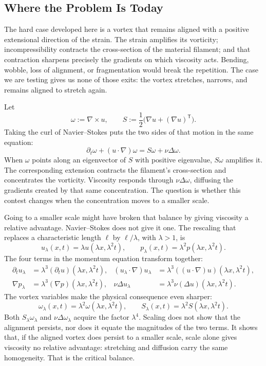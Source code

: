 \subsection{Where the Problem Is Today}\label{sub:ThePerfectlyStretchingVortex}

The hard case developed here is a vortex that remains aligned with a positive extensional direction of the strain.  The strain amplifies its vorticity; incompressibility contracts the cross-section of the material filament; and that contraction sharpens precisely the gradients on which viscosity acts.  Bending, wobble, loss of alignment, or fragmentation would break the repetition.  The case we are testing gives us none of those exits: the vortex stretches, narrows, and remains aligned to stretch again.

Let
\[
  \omega:=\nabla\times u,
  \qquad
  S:=\frac12\bigl(\nabla u+(\nabla u)^{\mathsf T}\bigr).
\]
Taking the curl of Navier--Stokes puts the two sides of that motion in the same equation:
\begin{equation}\label{eq:VorticityEquation}
  \partial_t\omega+(u\cdot\nabla)\omega
  =S\omega+\nu\Delta\omega.
\end{equation}
When \(\omega\) points along an eigenvector of \(S\) with positive eigenvalue, \(S\omega\) amplifies it.  The corresponding extension contracts the filament's cross-section and concentrates the vorticity.  Viscosity responds through \(\nu\Delta\omega\), diffusing the gradients created by that same concentration.  The question is whether this contest changes when the concentration moves to a smaller scale.

Going to a smaller scale might have broken that balance by giving viscosity a relative advantage.  Navier--Stokes does not give it one.  The rescaling that replaces a characteristic length \(\ell\) by \(\ell/\lambda\), with \(\lambda>1\), is
\[
  u_\lambda(x,t)=\lambda u(\lambda x,\lambda^2t),
  \qquad
  p_\lambda(x,t)=\lambda^2p(\lambda x,\lambda^2t).
\]
The four terms in the momentum equation transform together:
\[
\begin{aligned}
  \partial_tu_\lambda
  &=\lambda^3(\partial_tu)(\lambda x,\lambda^2t),
  &
  (u_\lambda\cdot\nabla)u_\lambda
  &=\lambda^3((u\cdot\nabla)u)(\lambda x,\lambda^2t),
  \\
  \nabla p_\lambda
  &=\lambda^3(\nabla p)(\lambda x,\lambda^2t),
  &
  \nu\Delta u_\lambda
  &=\lambda^3\nu(\Delta u)(\lambda x,\lambda^2t).
\end{aligned}
\]
The vortex variables make the physical consequence even sharper:
\[
  \omega_\lambda(x,t)=\lambda^2\omega(\lambda x,\lambda^2t),
  \qquad
  S_\lambda(x,t)=\lambda^2S(\lambda x,\lambda^2t).
\]
Both \(S_\lambda\omega_\lambda\) and \(\nu\Delta\omega_\lambda\) acquire the factor \(\lambda^4\).  Scaling does not show that the alignment persists, nor does it equate the magnitudes of the two terms.  It shows that, if the aligned vortex does persist to a smaller scale, scale alone gives viscosity no relative advantage: stretching and diffusion carry the same homogeneity.  That is the critical balance.

